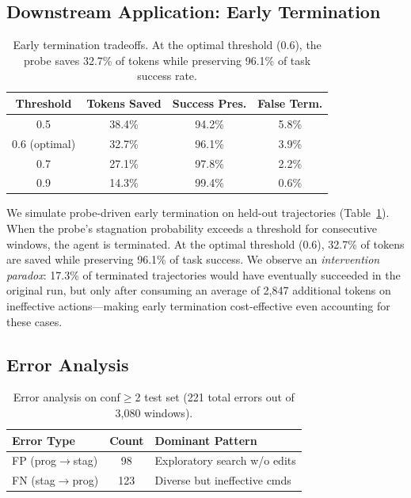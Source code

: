 \documentclass[11pt,a4paper]{article}
\begin{document}
\subsection{Downstream Application: Early Termination}

\begin{table}[t]
\centering
\small
\begin{tabular}{cccc}
\toprule
\textbf{Threshold} & \textbf{Tokens Saved} & \textbf{Success Pres.} & \textbf{False Term.} \\
\midrule
0.5 & 38.4\% & 94.2\% & 5.8\% \\
0.6 (optimal) & 32.7\% & 96.1\% & 3.9\% \\
0.7 & 27.1\% & 97.8\% & 2.2\% \\
0.9 & 14.3\% & 99.4\% & 0.6\% \\
\bottomrule
\end{tabular}
\caption{Early termination tradeoffs. At the optimal threshold (0.6), the probe saves 32.7\% of tokens while preserving 96.1\% of task success rate.}
\label{tab:early-term}
\end{table}

We simulate probe-driven early termination on held-out trajectories (Table~\ref{tab:early-term}).
When the probe's stagnation probability exceeds a threshold for consecutive windows, the agent is terminated.
At the optimal threshold (0.6), 32.7\% of tokens are saved while preserving 96.1\% of task success.
We observe an \emph{intervention paradox}: 17.3\% of terminated trajectories would have eventually succeeded in the original run, but only after consuming an average of 2,847 additional tokens on ineffective actions---making early termination cost-effective even accounting for these cases.

\subsection{Error Analysis}

\begin{table}[t]
\centering
\small
\begin{tabular}{lcl}
\toprule
\textbf{Error Type} & \textbf{Count} & \textbf{Dominant Pattern} \\
\midrule
FP (prog$\to$stag) & 98 & Exploratory search w/o edits \\
FN (stag$\to$prog) & 123 & Diverse but ineffective cmds \\
\bottomrule
\end{tabular}
\caption{Error analysis on conf$\geq$2 test set (221 total errors out of 3,080 windows).}
\label{tab:errors}
\end{table}
\end{document}

